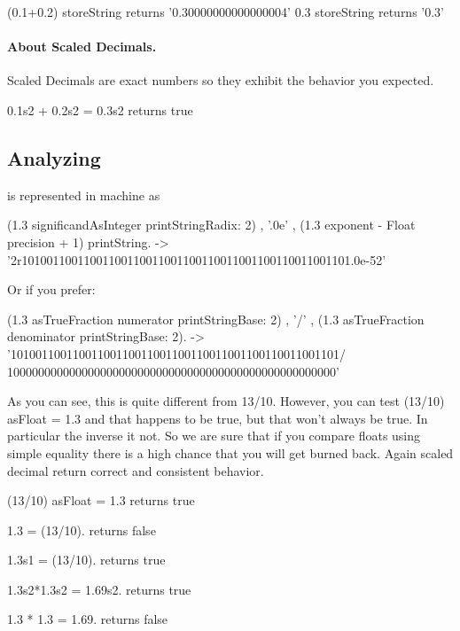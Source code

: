 \documentclass[a4paper,10pt,twoside]{book}
\begin{document}
\begin{code}{}
(0.1+0.2) storeString 
	returns 	'0.30000000000000004' 
0.3 storeString 
	returns	'0.3'
\end{code}	
		
		
\paragraph{About Scaled Decimals.}
Scaled Decimals are exact numbers so they exhibit the behavior you expected.

\begin{code}{}
0.1s2 + 0.2s2 = 0.3s2
	returns true
\end{code}		
		

\subsection{Analyzing }
 is represented in machine as

\begin{code}{}
(1.3 significandAsInteger printStringRadix: 2) , '.0e' , (1.3 exponent
- Float precision + 1) printString.
-> '2r10100110011001100110011001100110011001100110011001101.0e-52'
\end{code}

Or if you prefer:

\begin{code}{}
(1.3 asTrueFraction numerator printStringBase: 2) , '/' , (1.3
asTrueFraction denominator printStringBase: 2).
-> '10100110011001100110011001100110011001100110011001101/
10000000000000000000000000000000000000000000000000000'
\end{code}

As you can see, this is quite different from 13/10. However, you can test (13/10) asFloat = 1.3 and that happens to be true, but that won't always be true. In particular the inverse it not. So we are sure that if you compare floats using simple equality there is a high chance that you will get burned back. Again scaled decimal return correct and consistent behavior.

\begin{code}{}
(13/10) asFloat = 1.3
	returns true

1.3 = (13/10).
	returns false
	
1.3s1 = (13/10).
	returns true

1.3s2*1.3s2 = 1.69s2.
	returns true

1.3 * 1.3 = 1.69.
	returns false
\end{code}
\end{document}
